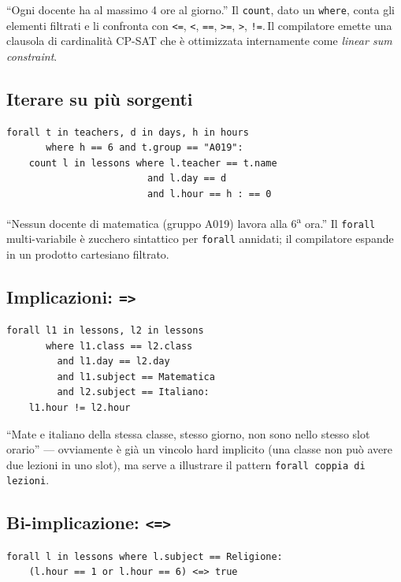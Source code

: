 ``Ogni docente ha al massimo 4 ore al giorno.'' Il
\texttt{count}, dato un \texttt{where}, conta gli elementi
filtrati e li confronta con \texttt{<=}, \texttt{<},
\texttt{==}, \texttt{>=}, \texttt{>}, \texttt{!=}.\,Il
compilatore emette una clausola di cardinalit\`a CP-SAT che
\`e ottimizzata internamente come \emph{linear sum
constraint}.

\subsection{Iterare su pi\`u sorgenti}

\begin{lstlisting}[basicstyle=\ttfamily\small]
forall t in teachers, d in days, h in hours
       where h == 6 and t.group == "A019":
    count l in lessons where l.teacher == t.name
                         and l.day == d
                         and l.hour == h : == 0
\end{lstlisting}

``Nessun docente di matematica (gruppo A019) lavora alla
6\textsuperscript{a} ora.'' Il \texttt{forall} multi-variabile
\`e zucchero sintattico per \texttt{forall} annidati; il
compilatore espande in un prodotto cartesiano filtrato.

\subsection{Implicazioni: \texttt{=>}}

\begin{lstlisting}[basicstyle=\ttfamily\small]
forall l1 in lessons, l2 in lessons
       where l1.class == l2.class
         and l1.day == l2.day
         and l1.subject == Matematica
         and l2.subject == Italiano:
    l1.hour != l2.hour
\end{lstlisting}

``Mate e italiano della stessa classe, stesso giorno, non sono
nello stesso slot orario'' --- ovviamente \`e gi\`a un vincolo
hard implicito (una classe non pu\`o avere due lezioni in uno
slot), ma serve a illustrare il pattern \texttt{forall coppia
di lezioni}.

\subsection{Bi-implicazione: \texttt{<=>}}

\begin{lstlisting}[basicstyle=\ttfamily\small]
forall l in lessons where l.subject == Religione:
    (l.hour == 1 or l.hour == 6) <=> true
\end{lstlisting}

